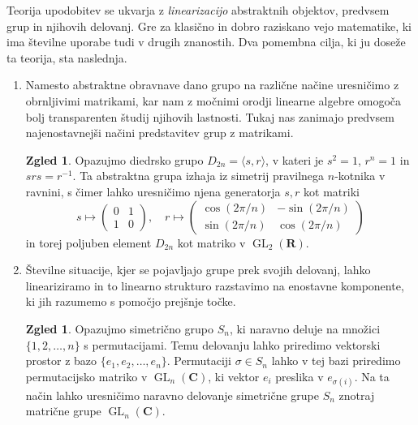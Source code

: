 \documentclass[11pt]{book}
\def\RR{\mathbf{R}}
\def\CC{\mathbf{C}}
\DeclareMathOperator\GL{GL}
\theoremstyle{definition}
\theoremstyle{zgled}
\theoremstyle{zgledbrezstevilke}
\newtheorem{zgledbrezstevilke}[theorem]{Zgled}
\theoremstyle{odprtproblem}
\theoremstyle{domacanaloga}
\theoremstyle{izrek}
\begin{document}
Teorija upodobitev se ukvarja z \emph{linearizacijo} abstraktnih objektov, predvsem grup in njihovih delovanj. Gre za klasično in dobro raziskano vejo matematike, ki ima številne uporabe tudi v drugih znanostih. Dva pomembna cilja, ki ju doseže ta teorija, sta naslednja. 

\begin{enumerate}
    \item Namesto abstraktne obravnave dano grupo na različne načine uresničimo z obrnljivimi matrikami, kar nam z močnimi orodji linearne algebre omogoča bolj transparenten študij njihovih lastnosti. Tukaj nas zanimajo predvsem najenostavnejši načini predstavitev grup z matrikami.
    
    \begin{zgledbrezstevilke}
        Opazujmo diedrsko grupo $D_{2n} = \langle s, r \rangle$, v kateri je $s^2 = 1$, $r^n = 1$ in $s r s = r^{-1}$. Ta abstraktna grupa izhaja iz simetrij pravilnega $n$-kotnika v ravnini, s čimer lahko uresničimo njena generatorja $s,r$ kot matriki
        \[
            s \mapsto \begin{pmatrix}
                0 & 1 \\ 1 & 0
            \end{pmatrix}, \quad
            r \mapsto \begin{pmatrix}
                \cos(2 \pi/n) & - \sin(2 \pi/n) \\
                \sin(2 \pi/n) & \cos(2 \pi/n)
            \end{pmatrix}
        \]
        in torej poljuben element $D_{2n}$ kot matriko v $\GL_2(\RR)$.
    \end{zgledbrezstevilke}

    \item Številne situacije, kjer se pojavljajo grupe prek svojih delovanj, lahko lineariziramo in to linearno strukturo razstavimo na enostavne komponente, ki jih razumemo s pomočjo prejšnje točke.
    
    \begin{zgledbrezstevilke}
        Opazujmo simetrično grupo $S_n$, ki naravno deluje na množici $\{ 1, 2, \dots, n \}$ s permutacijami. Temu delovanju lahko priredimo vektorski prostor z bazo $\{ e_1, e_2, \dots, e_n \}$. Permutaciji $\sigma \in S_n$ lahko v tej bazi priredimo permutacijsko matriko v $\GL_n(\CC)$, ki vektor $e_i$ preslika v $e_{\sigma(i)}$. Na ta način lahko uresničimo naravno delovanje simetrične grupe $S_n$ znotraj matrične grupe $\GL_n(\CC)$.
    \end{zgledbrezstevilke}
\end{enumerate}
\end{document}
